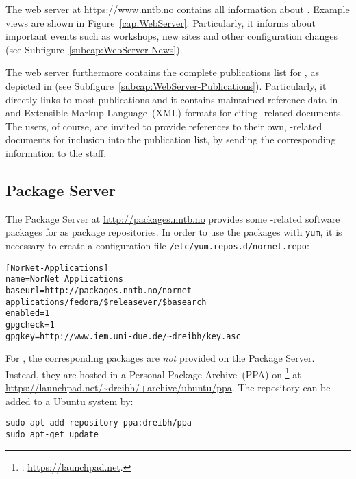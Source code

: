 The  web server at \url{https://www.nntb.no} contains all information about . Example views are shown in Figure~\ref{cap:WebServer}. Particularly, it informs about important events such as workshops, new sites and other configuration changes (see Subfigure~\ref{subcap:WebServer-News}).

The web server furthermore contains the complete publications list for , as depicted in (see Subfigure~\ref{subcap:WebServer-Publications}). Particularly, it directly links to most publications and it contains maintained reference data in \BibTeX\index{\BibTeX} and Extensible Markup Language~(XML) formats for citing -related documents.
The  users, of course, are invited to provide references to their own, -related documents for inclusion into the publication list, by sending the corresponding \BibTeX{} information to the  staff.


\subsection{Package Server}

The Package Server at \url{http://packages.nntb.no} provides some -related software packages for  as package repositories. In order to use the packages with \texttt{yum}, it is necessary to create a configuration file \texttt{/etc/yum.repos.d/nornet.repo}:
\begin{tiny}
\begin{lstlisting}
[NorNet-Applications]
name=NorNet Applications
baseurl=http://packages.nntb.no/nornet-applications/fedora/$releasever/$basearch
enabled=1
gpgcheck=1
gpgkey=http://www.iem.uni-due.de/~dreibh/key.asc
\end{lstlisting}
\end{tiny}

For , the corresponding packages are \emph{not} provided on the Package Server. Instead, they are hosted in a Personal Package Archive~(PPA) on \footnote{: \url{https://launchpad.net}.} at \url{https://launchpad.net/~dreibh/+archive/ubuntu/ppa}. The repository can be added to a Ubuntu system by:
\begin{lstlisting}
sudo apt-add-repository ppa:dreibh/ppa
sudo apt-get update
\end{lstlisting}


